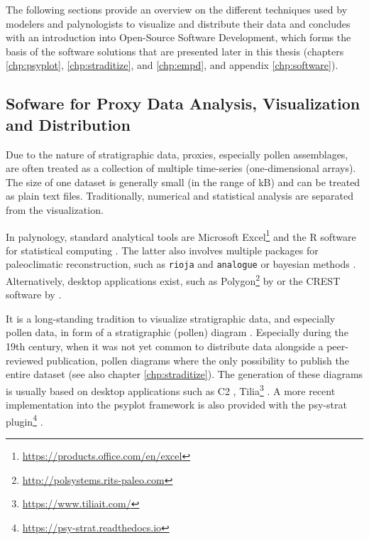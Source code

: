 \begin{refsection}
The following sections provide an overview on the different techniques used by modelers and palynologists to visualize and distribute their data and concludes with an introduction into Open-Source Software Development, which forms the basis of the software solutions that are presented later in this thesis (chapters \ref{chp:psyplot}, \ref{chp:straditize}, and \ref{chp:empd}, and appendix \ref{chp:software}).

\subsection{Sofware for Proxy Data Analysis, Visualization and Distribution} \label{sec:intro-software-data}

Due to the nature of stratigraphic data, proxies, especially pollen assemblages, are often treated as a collection of multiple time-series (one-dimensional arrays). The size of one dataset is generally small (in the range of kB) and can be treated as plain text files. Traditionally, numerical and statistical analysis are separated from the visualization. 

In palynology, standard analytical tools are Microsoft Excel\footnote{\url{https://products.office.com/en/excel}} and the R software for statistical computing \citep{RCT2019}. The latter also involves multiple packages for paleoclimatic reconstruction, such as \texttt{rioja} \citep{Juggins2017} and \texttt{analogue} \citep{SimpsonOksanen2019, Simpson2007} or bayesian methods \citep{NolanTiptonBoothEtAl2019, Tipton2017}. Alternatively, desktop applications exist, such as Polygon\footnote{\url{http://polsystems.rits-paleo.com}} by \cite{NakagawaTarasovNishidaEtAl2002} or the CREST software by \cite{ChevalierCheddadiChase2014, Chevalier2019}.

It is a long-standing tradition to visualize stratigraphic data, and especially pollen data, in form of a stratigraphic (pollen) diagram \citep{Bradley1985, Grimm1988}. Especially during the 19th century, when it was not yet common to distribute data alongside a peer-reviewed publication, pollen diagrams where the only possibility to publish the entire dataset (see also chapter \ref{chp:straditize}). The generation of these diagrams is usually based on desktop applications such as C2 \citep{Juggins2007}, Tilia\footnote{\url{https://www.tiliait.com/}} \citep{Grimm1988, Grimm1991}. A more recent implementation into the psyplot framework \citep[chapter \ref{chp:psyplot}]{Sommer2017} is also provided with the psy-strat plugin\footnote{\url{https://psy-strat.readthedocs.io}} \citep{Sommer2019}.


\end{refsection}
